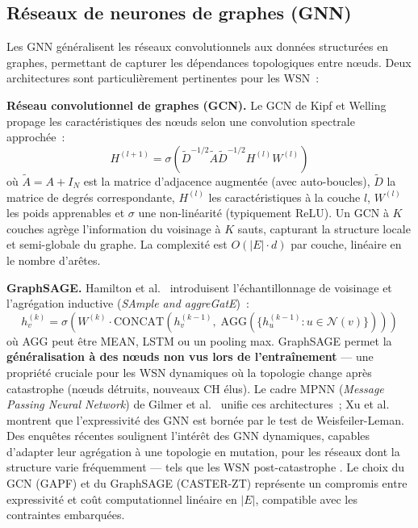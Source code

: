 \subsection{Réseaux de neurones de graphes (GNN)}

Les GNN généralisent les réseaux convolutionnels aux données structurées en graphes, permettant de capturer les dépendances topologiques entre n\oe{}uds. Deux architectures sont particulièrement pertinentes pour les WSN~:

\textbf{Réseau convolutionnel de graphes (GCN).} Le GCN de Kipf et Welling \cite{kipf2017semi} propage les caractéristiques des n\oe{}uds selon une convolution spectrale approchée~:
\begin{equation}
    H^{(l+1)} = \sigma\!\left(\tilde{D}^{-1/2} \tilde{A} \tilde{D}^{-1/2} H^{(l)} W^{(l)}\right)
\end{equation}
où $\tilde{A} = A + I_N$ est la matrice d'adjacence augmentée (avec auto-boucles), $\tilde{D}$ la matrice de degrés correspondante, $H^{(l)}$ les caractéristiques à la couche $l$, $W^{(l)}$ les poids apprenables et $\sigma$ une non-linéarité (typiquement ReLU). Un GCN à $K$ couches agrège l'information du voisinage à $K$ sauts, capturant la structure locale et semi-globale du graphe. La complexité est $O(|E| \cdot d)$ par couche, linéaire en le nombre d'arêtes.

\textbf{GraphSAGE.} Hamilton et al.\ \cite{hamilton2017graphsage} introduisent l'échantillonnage de voisinage et l'agrégation inductive (\emph{SAmple and aggreGatE})~:
\begin{equation}
    h_v^{(k)} = \sigma\!\left(W^{(k)} \cdot \text{CONCAT}\!\left(h_v^{(k-1)},\; \text{AGG}\!\left(\{h_u^{(k-1)} : u \in \mathcal{N}(v)\}\right)\right)\right)
\end{equation}
où AGG peut être MEAN, LSTM ou un pooling max. GraphSAGE permet la \textbf{généralisation à des n\oe{}uds non vus lors de l'entraînement} --- une propriété cruciale pour les WSN dynamiques où la topologie change après catastrophe (n\oe{}uds détruits, nouveaux CH élus). Le cadre MPNN (\emph{Message Passing Neural Network}) de Gilmer et al.\ \cite{gilmer2017mpnn} unifie ces architectures~; Xu et al.\ \cite{xu2019gin} montrent que l'expressivité des GNN est bornée par le test de Weisfeiler-Leman. Des enquêtes récentes soulignent l'intérêt des GNN dynamiques, capables d'adapter leur agrégation à une topologie en mutation, pour les réseaux dont la structure varie fréquemment --- tels que les WSN post-catastrophe \cite{dynamic_gnn_tkde2026}. Le choix du GCN (GAPF) et du GraphSAGE (CASTER-ZT) représente un compromis entre expressivité et coût computationnel linéaire en $|E|$, compatible avec les contraintes embarquées.

